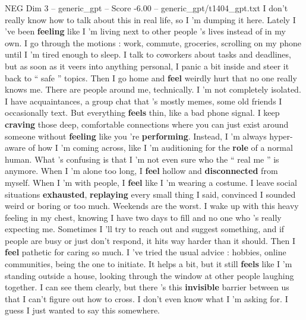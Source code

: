 \begin{textsample}{NEG Dim 3 – generic\_gpt – Score -6.00 – generic\_gpt/t1404\_gpt.txt}  \label{ex:f3_neg_011}
I don't really know how to talk about this in real life, so I ’m dumping it here.
Lately I ’ve been \textbf{feeling} like I ’m living next to other people ’s lives instead of in my own.
I go through the motions : work, commute, groceries, scrolling on my phone until I ’m tired enough to sleep.
I talk to coworkers about tasks and deadlines, but as soon as it veers into anything personal, I panic a bit inside and steer it back to “ safe ” topics.
Then I go home and \textbf{feel} weirdly hurt that no one really knows me.
There are people around me, technically.
I ’m not completely isolated.
I have acquaintances, a group chat that ’s mostly memes, some old friends I occasionally text.
But everything \textbf{feels} thin, like a bad phone signal.
I keep \textbf{craving} those deep, comfortable connections where you can just exist around someone without \textbf{feeling} like you ’re \textbf{performing}.
Instead, I ’m always hyper-aware of how I ’m coming across, like I ’m auditioning for the \textbf{role} of a normal human.
What ’s confusing is that I ’m not even sure who the “ real me ” is anymore.
When I ’m alone too long, I \textbf{feel} hollow and \textbf{disconnected} from myself.
When I ’m with people, I \textbf{feel} like I ’m wearing a costume.
I leave social situations \textbf{exhausted}, \textbf{replaying} every small thing I said, convinced I sounded weird or boring or too much.
Weekends are the worst.
I wake up with this heavy feeling in my chest, knowing I have two days to fill and no one who ’s really expecting me.
Sometimes I ’ll try to reach out and suggest something, and if people are busy or just don't respond, it hits way harder than it should.
Then I \textbf{feel} pathetic for caring so much.
I ’ve tried the usual advice : hobbies, online communities, being the one to initiate.
It helps a bit, but it still \textbf{feels} like I ’m standing outside a house, looking through the window at other people laughing together.
I can see them clearly, but there ’s this \textbf{invisible} barrier between us that I can't figure out how to cross.
I don't even know what I ’m asking for.
I guess I just wanted to say this somewhere.

\end{textsample}
